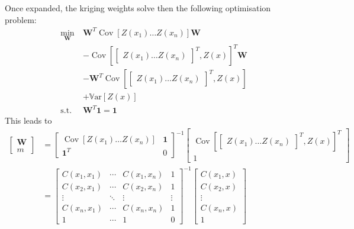 \documentclass[a4paper,11pt]{article}
\newcommand{\Var}{\mathbb{V}\text{ar}}
\DeclareMathOperator{\Cov}{\mathrm{Cov}}
\begin{document}
Once expanded, the kriging weights solve then the following optimisation problem:
\begin{align}
  \min_{\mathbf{W}} ~&\mathbf{W}^T \Cov\left[Z(x_1) \dots Z(x_n)\right] \mathbf{W}\\ &-\Cov\left[
    \begin{bmatrix}
      Z(x_1) \dots Z(x_n)
    \end{bmatrix}^T, Z(x) \right]^T \mathbf{W}\\ &- \mathbf{W}^T\Cov\left[
    \begin{bmatrix}
      Z(x_1) \dots Z(x_n)
    \end{bmatrix}^T, Z(x) \right] \\ &+ \Var\left[Z(x)\right] \\
  \text{s.t.}& \mathbf{W}^T \mathbf{1} = \mathbf{1}
\end{align}
This leads to
\begin{align}
  \begin{bmatrix}
    \mathbf{W} \\ m
  \end{bmatrix}
  &=
  \begin{bmatrix}
    \Cov\left[Z(x_1) \dots Z(x_n)\right] & \mathbf{1} \\
  \mathbf{1}^T & 0
\end{bmatrix}^{-1}
                 \begin{bmatrix}
                  \Cov\left[
    \begin{bmatrix}
      Z(x_1) \dots Z(x_n)
    \end{bmatrix}^T, Z(x) \right]^T \\ 1 
\end{bmatrix}
  \\ &=
    \begin{bmatrix}
      C(x_1, x_1) & \cdots & C(x_1, x_n) & 1 \\
      C(x_2, x_1) & \cdots & C(x_2, x_n) & 1 \\
      \vdots & \ddots & \vdots & \vdots \\
      C(x_n, x_1) & \cdots & C(x_n, x_n)& 1 \\
      1 & \cdots & 1 & 0
    \end{bmatrix}^{-1}
                       \begin{bmatrix}
                         C(x_1, x) \\
                         C(x_2, x) \\
                         \vdots \\
                         C(x_n, x) \\
                         1
                       \end{bmatrix}
\end{align}
\end{document}
